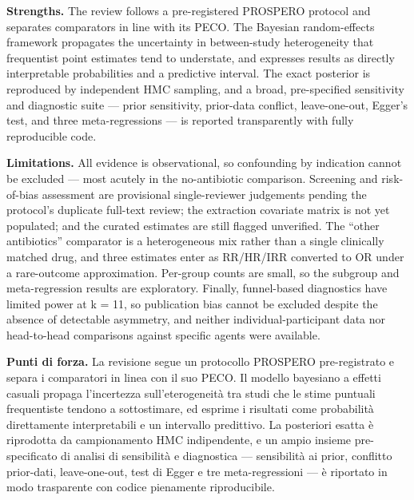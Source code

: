 \documentclass[
  letterpaper,
  DIV=11,
  numbers=noendperiod]{scrartcl}
\begin{document}
\textbf{Strengths.} The review follows a pre-registered PROSPERO
protocol and separates comparators in line with its PECO. The Bayesian
random-effects framework propagates the uncertainty in between-study
heterogeneity that frequentist point estimates tend to understate, and
expresses results as directly interpretable probabilities and a
predictive interval. The exact posterior is reproduced by independent
HMC sampling, and a broad, pre-specified sensitivity and diagnostic
suite --- prior sensitivity, prior-data conflict, leave-one-out, Egger's
test, and three meta-regressions --- is reported transparently with
fully reproducible code.

\textbf{Limitations.} All evidence is observational, so confounding by
indication cannot be excluded --- most acutely in the no-antibiotic
comparison. Screening and risk-of-bias assessment are provisional
single-reviewer judgements pending the protocol's duplicate full-text
review; the extraction covariate matrix is not yet populated; and the
curated estimates are still flagged unverified. The ``other
antibiotics'' comparator is a heterogeneous mix rather than a single
clinically matched drug, and three estimates enter as RR/HR/IRR
converted to OR under a rare-outcome approximation. Per-group counts are
small, so the subgroup and meta-regression results are exploratory.
Finally, funnel-based diagnostics have limited power at k = 11, so
publication bias cannot be excluded despite the absence of detectable
asymmetry, and neither individual-participant data nor head-to-head
comparisons against specific agents were available.

\textbf{Punti di forza.} La revisione segue un protocollo PROSPERO
pre-registrato e separa i comparatori in linea con il suo PECO. Il
modello bayesiano a effetti casuali propaga l'incertezza
sull'eterogeneità tra studi che le stime puntuali frequentiste tendono a
sottostimare, ed esprime i risultati come probabilità direttamente
interpretabili e un intervallo predittivo. La posteriori esatta è
riprodotta da campionamento HMC indipendente, e un ampio insieme
pre-specificato di analisi di sensibilità e diagnostica --- sensibilità
ai prior, conflitto prior-dati, leave-one-out, test di Egger e tre
meta-regressioni --- è riportato in modo trasparente con codice
pienamente riproducibile.
\end{document}
